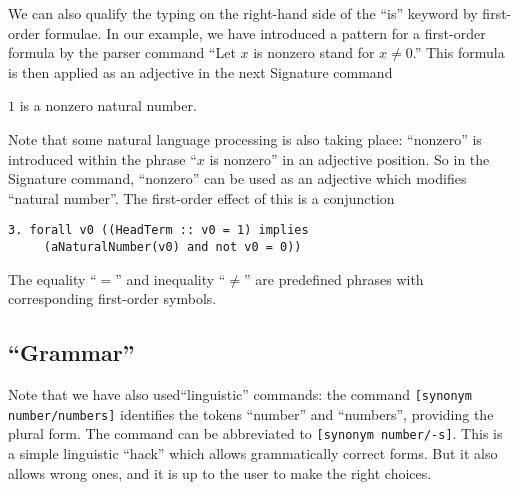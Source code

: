 \documentclass{stex}
\begin{document}
We can also qualify the typing on the right-hand side of the
``is'' keyword
by first-order formulae. In our example, we have introduced a pattern for
a first-order formula by the parser command
``Let $x$ is nonzero stand for $x \neq 0$.''
This formula is then applied
as an adjective in the next Signature command
\begin{signature} $1$ is a nonzero natural number.
\end{signature}
Note that some natural language processing is also taking place:
``nonzero'' is introduced within the phrase ``$x$ is nonzero''
in an
adjective position. So in the Signature command, ``nonzero''
can be
used as an adjective which modifies ``natural number''.
The first-order
effect of this is a conjunction
\begin{verbatim}
3. forall v0 ((HeadTerm :: v0 = 1) implies
     (aNaturalNumber(v0) and not v0 = 0))
\end{verbatim}
The equality ``$=$'' and inequality ``$\neq$'' are predefined
phrases with corresponding first-order symbols.

\subsection{``Grammar''}

Note that we have also used``linguistic'' commands:
the command \verb+[synonym number/numbers]+
identifies the tokens ``number'' and ``numbers'', providing the
plural form. The command can be abbreviated to
\verb+[synonym number/-s]+. This is a simple linguistic
``hack'' which allows grammatically correct forms. But it
also allows wrong ones, and it is up to the user to make the right
choices.
\end{document}
